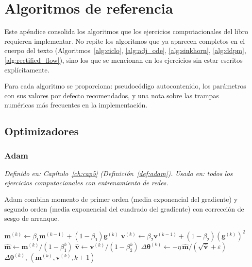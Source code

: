 \chapter{Algoritmos de referencia}
\label{ap:algoritmos}

Este apéndice consolida los algoritmos que los ejercicios computacionales del
libro requieren implementar. No repite los algoritmos que ya aparecen completos
en el cuerpo del texto (Algoritmos~\ref{alg:ciclo}, \ref{alg:adj_ode},
\ref{alg:sinkhorn}, \ref{alg:ddpm}, \ref{alg:rectified_flow}), sino los que se
mencionan en los ejercicios sin estar escritos explícitamente.

Para cada algoritmo se proporciona: pseudocódigo autocontenido, los parámetros
con sus valores por defecto recomendados, y una nota sobre las trampas numéricas
más frecuentes en la implementación.

\section{Optimizadores}
\label{sec:ap_optimizadores}

\subsection{Adam}
\label{subsec:ap_adam}

\textit{Definido en: Capítulo~\ref{ch:cap5} (Definición~\ref{def:adam}).
Usado en: todos los ejercicios computacionales con entrenamiento de redes.}

\medskip
Adam combina momento de primer orden (media exponencial del gradiente) y
segundo orden (media exponencial del cuadrado del gradiente) con corrección
de sesgo de arranque.

\begin{algorithm}[H]
\caption{Adam -- paso de actualización}
\label{alg:ap_adam}

$\bm{m}^{(k)} \leftarrow \beta_1\bm{m}^{(k-1)} + (1-\beta_1)\bm{g}^{(k)}$\;
$\bm{v}^{(k)} \leftarrow \beta_2\bm{v}^{(k-1)} + (1-\beta_2)(\bm{g}^{(k)})^2$\;
$\hat{\bm{m}} \leftarrow \bm{m}^{(k)}/(1-\beta_1^k)$
$\hat{\bm{v}} \leftarrow \bm{v}^{(k)}/(1-\beta_2^k)$
$\Delta\bm{\theta}^{(k)} \leftarrow -\eta\,\hat{\bm{m}}/(\sqrt{\hat{\bm{v}}}+\varepsilon)$\;
\Return $\Delta\bm{\theta}^{(k)}$, $(\bm{m}^{(k)}, \bm{v}^{(k)}, k+1)$\;
\end{algorithm}

